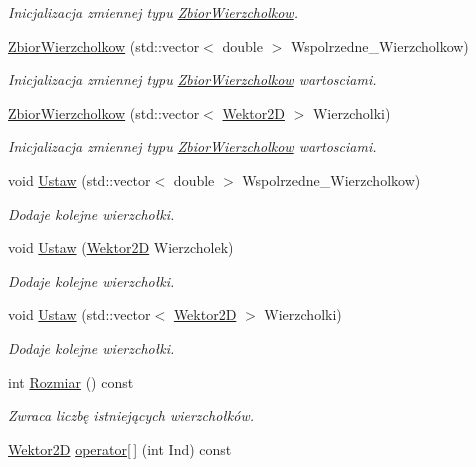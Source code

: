 \begin{DoxyCompactItemize}
\begin{DoxyCompactList}\small\item\em Inicjalizacja zmiennej typu \hyperlink{class_zbior_wierzcholkow}{Zbior\+Wierzcholkow}. \end{DoxyCompactList}\item 
\hyperlink{class_zbior_wierzcholkow_a68d1a1df685ea2cecc3e3e844e453e3b}{Zbior\+Wierzcholkow} (std\+::vector$<$ double $>$ Wspolrzedne\+\_\+\+Wierzcholkow)
\begin{DoxyCompactList}\small\item\em Inicjalizacja zmiennej typu \hyperlink{class_zbior_wierzcholkow}{Zbior\+Wierzcholkow} wartosciami. \end{DoxyCompactList}\item 
\hyperlink{class_zbior_wierzcholkow_a4915a3abcfb117bad7ffccc5e00beb24}{Zbior\+Wierzcholkow} (std\+::vector$<$ \hyperlink{class_wektor2_d}{Wektor2\+D} $>$ Wierzcholki)
\begin{DoxyCompactList}\small\item\em Inicjalizacja zmiennej typu \hyperlink{class_zbior_wierzcholkow}{Zbior\+Wierzcholkow} wartosciami. \end{DoxyCompactList}\item 
void \hyperlink{class_zbior_wierzcholkow_a0c6ac1323cbdf64c8efb1ce057da6140}{Ustaw} (std\+::vector$<$ double $>$ Wspolrzedne\+\_\+\+Wierzcholkow)
\begin{DoxyCompactList}\small\item\em Dodaje kolejne wierzchołki. \end{DoxyCompactList}\item 
void \hyperlink{class_zbior_wierzcholkow_a991bb11400e9ac0d81ff86663bf2c4dc}{Ustaw} (\hyperlink{class_wektor2_d}{Wektor2\+D} Wierzcholek)
\begin{DoxyCompactList}\small\item\em Dodaje kolejne wierzchołki. \end{DoxyCompactList}\item 
void \hyperlink{class_zbior_wierzcholkow_a5b35dc69efe515e788a162716b9d584e}{Ustaw} (std\+::vector$<$ \hyperlink{class_wektor2_d}{Wektor2\+D} $>$ Wierzcholki)
\begin{DoxyCompactList}\small\item\em Dodaje kolejne wierzchołki. \end{DoxyCompactList}\item 
int \hyperlink{class_zbior_wierzcholkow_a3a5b18af77d0db0b630e865417651920}{Rozmiar} () const 
\begin{DoxyCompactList}\small\item\em Zwraca liczbę istniejących wierzchołków. \end{DoxyCompactList}\item 
\hypertarget{class_zbior_wierzcholkow_a216b7dc6fc04e20782ff5ee421aff394}{\hyperlink{class_wektor2_d}{Wektor2\+D} \hyperlink{class_zbior_wierzcholkow_a216b7dc6fc04e20782ff5ee421aff394}{operator\mbox{[}$\,$\mbox{]}} (int Ind) const }\label{class_zbior_wierzcholkow_a216b7dc6fc04e20782ff5ee421aff394}


\end{DoxyCompactItemize}
